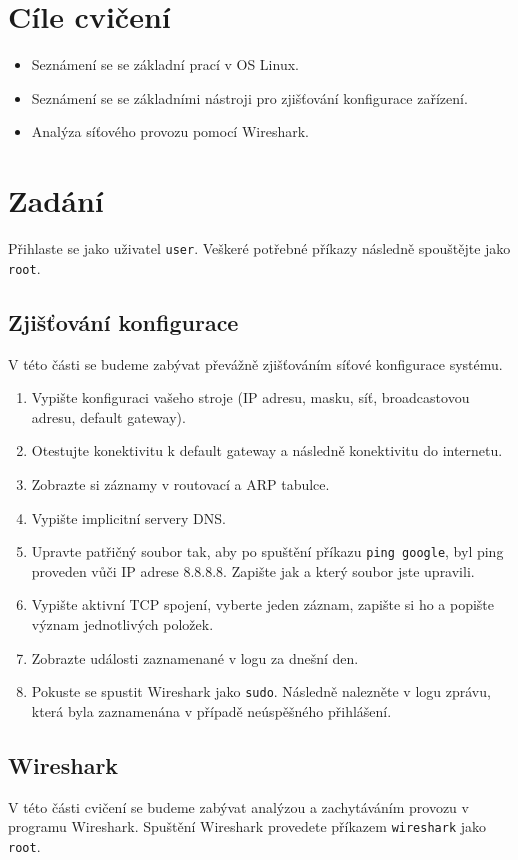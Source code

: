 \section{Cíle cvičení}
\begin{itemize}
	\item Seznámení se se základní prací v OS Linux.
	\item Seznámení se se základními nástroji pro zjišťování konfigurace zařízení.
	\item Analýza síťového provozu pomocí Wireshark.
\end{itemize}

\section{Zadání}
Přihlaste se jako uživatel \texttt{user}. Veškeré potřebné příkazy následně spouštějte jako \texttt{root}.

\subsection{Zjišťování konfigurace}
V této části se budeme zabývat převážně zjišťováním síťové konfigurace systému.

\begin{enumerate}
\item Vypište konfiguraci vašeho stroje (IP adresu, masku, síť, broadcastovou adresu, default gateway).
\item Otestujte konektivitu k default gateway a následně konektivitu do internetu.
\item Zobrazte si záznamy v routovací a ARP tabulce.
\item Vypište implicitní servery DNS.
\item Upravte patřičný soubor tak, aby po spuštění příkazu \texttt{ping google}, byl ping proveden vůči IP adrese 8.8.8.8. Zapište jak a který soubor jste upravili.
\item Vypište aktivní TCP spojení, vyberte jeden záznam, zapište si ho a popište význam jednotlivých položek.
\item Zobrazte události zaznamenané v logu za dnešní den.
\item Pokuste se spustit Wireshark jako \texttt{sudo}. Následně nalezněte v logu zprávu, která byla zaznamenána v případě neúspěšného přihlášení.
\end{enumerate}

\subsection{Wireshark}
V této části cvičení se budeme zabývat analýzou a zachytáváním provozu v programu Wireshark. Spuštění Wireshark provedete příkazem \texttt{wireshark} jako \texttt{root}.

